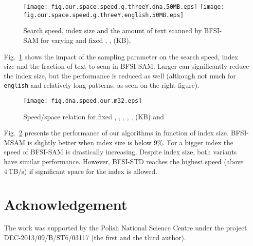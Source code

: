 \documentclass{llncs}
\begin{document}
\begin{figure}[pt]
\centerline{
\texttt{[image: fig.our.space.speed.g.threeY.dna.50MB.eps]}
\texttt{[image: fig.our.space.speed.g.threeY.english.50MB.eps]}
}
\caption[Results]
{Search speed, index size and the amount of text scanned by BFSI-SAM for varying  and fixed , ,  (KB), }
\label{fig:speed_space_g_threeY}
\end{figure}








Fig.~\ref{fig:speed_space_g_threeY} shows the impact of the sampling 
parameter  on the search speed, index size and the fraction of text to scan 
in BFSI-SAM.
Larger  can significantly reduce the index size,
but the performance is reduced as well (although not much for \texttt{english} and relatively long patterns, 
as seen on the right figure). 



\begin{figure}[h]
\centerline{
\texttt{[image: fig.dna.speed.our.m32.eps]}
}
\caption[Results]
{Speed/space relation for fixed , , , , ,  (KB) and }
\label{fig:fig_dna_speed_our_m32_eps}
\end{figure}


Fig.~\ref{fig:fig_dna_speed_our_m32_eps} presents the performance of our algorithms in function of index size.
BFSI-MSAM is slightly better when index size is below 9\%. 
For a bigger index the speed of BFSI-SAM is drastically increasing. 
Despite index size, both variants have similar performance. 
However, BFSI-STD reaches the highest speed 
(above 4\,TB/s) 
if significant space for the index is allowed.





\section*{Acknowledgement}
The work was supported by the Polish National Science Centre under the project DEC-2013/09/B/ST6/03117 (the first and the third author).



\end{document}
